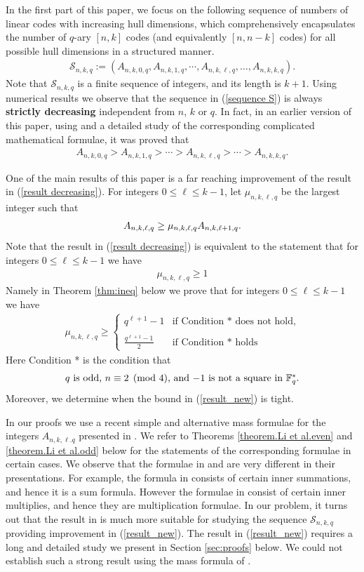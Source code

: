 \documentclass[a4paper,11pt]{article}
\newcommand{\F}{\mathbb{F}}
\newcommand{\be}{\begin{eqnarray}}
\newcommand{\ee}{\end{eqnarray}}
\newcommand{\nn}{{\nonumber}}
\newcommand{\dd}{\displaystyle}
\begin{document}
In the first part of this paper, we focus on the following sequence of numbers of linear codes with increasing hull dimensions,
which comprehensively encapsulates the number of
$q$-ary $[n,k]$ codes
(and equivalently  $[n,n-k]$ codes) for all possible hull dimensions in a structured manner.
\be \label{sequence S}
\mathcal{S}_{n,k,q}:=\left(A_{n,k,0,q},A_{n,k,1,q}, \cdots, A_{n,k,\ell,q}, \ldots, A_{n,k,k,q}\right).
\ee
Note that $\mathcal{S}_{n,k,q}$ is a finite sequence of integers, and its length is $k+1$. Using numerical results we observe that the sequence in (\ref{sequence S}) is always {\bf strictly decreasing} independent from $n$, $k$ or $q$. In fact, in an earlier version of this paper, using \cite{Sendrier_hull} and a detailed study of the corresponding complicated mathematical formulae, it was proved that
\be \label{result decreasing}
A_{n,k,0,q} > A_{n,k,1,q} > \cdots > A_{n,k,\ell,q} > \cdots > A_{n,k,k,q}.
\ee


One of the main results of this paper is a  far reaching improvement of the result in (\ref{result decreasing}). For integers $0 \le \ell \le k-1$, let $\mu_{n,k,\ell,q}$ be the largest integer such that
\be %
A_{n,k,\ell,q} \ge \mu_{n,k,\ell,q} A_{n,k,\ell+1,q}.
\nn\ee
Note that  the result in (\ref{result decreasing}) is equivalent to the statement that for integers $0 \le \ell \le k-1$ we have
\be \label{result2 decreasing}
\mu_{n,k,\ell,q} \ge 1
\ee
Namely in Theorem \ref{thm:ineq} below we prove that for integers $0 \le \ell \le k-1$ we have
\be \label{result_new}
\mu_{n,k,\ell,q} \ge \left\{
\begin{array}{rl}
q^{\ell+1} -1 & \mbox{if Condition * does not hold}, \\ \\
\dd \frac{q^{\ell+1}-1}{2} & \mbox{if Condition * holds}
\end{array}
\right.
\ee
Here Condition * is the condition that
\be
\mbox{$q$ is odd, $n \equiv 2 \pmod 4$, and $-1$ is not a square in $\F_q^*$}.
\nn\ee
 Moreover, we determine when the bound in (\ref{result_new}) is tight.

 In our proofs we use a recent simple and alternative mass formulae for the integers $A_{n,k,\ell.q}$ presented in \cite{LiShiLing}.
 We refer to Theorems \ref{theorem.Li et al.even} and \ref{theorem.Li et al.odd} below for the statements of the corresponding formulae in certain cases. We observe that the formulae in \cite{Sendrier_hull} and \cite{LiShiLing} are very different in their presentations. For example, the formula in \cite{Sendrier_hull} consists of certain inner summations, and hence it is a sum formula. However the formulae in \cite{LiShiLing} consist of certain inner multiplies, and hence they are multiplication formulae.
 In our problem, it turns out that the result in \cite{LiShiLing}
is much more suitable for studying the sequence $\mathcal{S}_{n,k,q}$ providing improvement in (\ref{result_new}).
The result in (\ref{result_new}) requires a long and detailed study we present in Section \ref{sec:proofs} below.
We could not establish such a strong result using the mass formula of \cite{Sendrier_hull}.
\end{document}
